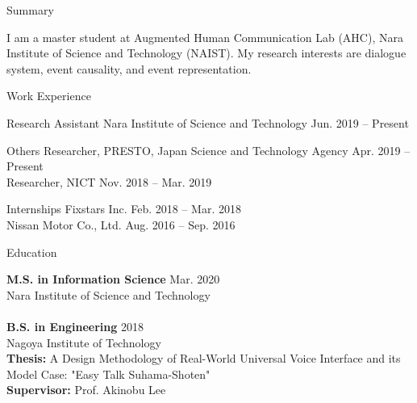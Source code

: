 \documentclass{resume} %
\begin{document}

\begin{rSection}{Summary}

I am a master student at Augmented Human Communication Lab (AHC), Nara Institute of Science and Technology (NAIST). My research interests are dialogue system, event causality, and event representation.

\end{rSection}


\begin{rSection}{Work Experience}

\begin{rSubsection}{Research Assistant}{}{}{}
Nara Institute of Science and Technology \hfill Jun. 2019 -- Present
\end{rSubsection}

\begin{rSubsection}{Others}{}{}{}
Researcher, PRESTO, Japan Science and Technology Agency \hfill Apr. 2019 -- Present
\\Researcher, NICT \hfill Nov. 2018 -- Mar. 2019
\end{rSubsection}

\begin{rSubsection}{Internships}{}{}{}
Fixstars Inc. \hfill Feb. 2018 -- Mar. 2018
\\Nissan Motor Co., Ltd. \hfill Aug. 2016 -- Sep. 2016
\end{rSubsection}

\end{rSection}


\begin{rSection}{Education}

{\bf M.S. in Information Science} \hfill Mar. 2020 
\\ Nara Institute of Science and Technology
\\
\\{\bf B.S. in Engineering} \hfill 2018 
\\ Nagoya Institute of Technology
\\ {\bf Thesis:} A Design Methodology of Real-World Universal Voice Interface and its Model Case: "Easy Talk Suhama-Shoten"
\\ {\bf Supervisor:} Prof. Akinobu Lee

\end{rSection}
\end{document}
